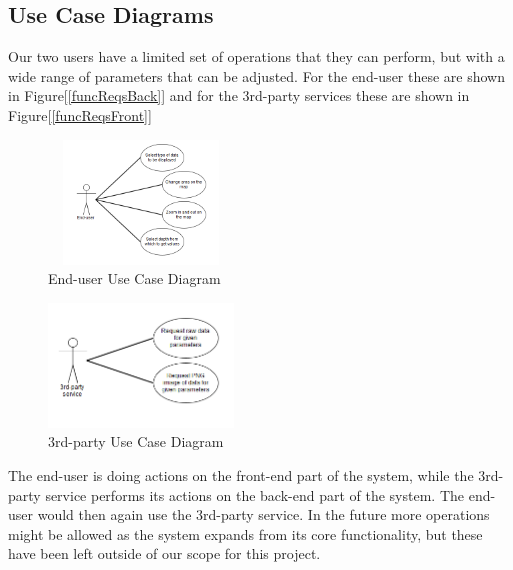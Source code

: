 \documentclass[11pt,a4paper,titlepage,oneside]{report}
\begin{document}
  \subsection{Use Case Diagrams}
  Our two users have a limited set of operations that they can perform, but with a wide range of parameters that can be adjusted. For the end-user these are shown in Figure[\ref{funcReqsBack}] and for the 3rd-party services these are shown in Figure[\ref{funcReqsFront}]
  \begin{figure}[h]
	\begin{center}
	\includegraphics[height=125px,width=186px]{img/useCase_EndUser.png}
	\caption{End-user Use Case Diagram}
	\label{fig:endUserUseDiagram}
	\small
	\end{center}
  \end{figure}

  \begin{figure}[h]
	\begin{center}
	\includegraphics[height=125px,width=186px]{img/useCase_3rdParty.png}
	\caption{3rd-party Use Case Diagram}
	\label{fig:3rdPartyUseDiagram}
	\small
	\end{center}
  \end{figure}

    The end-user is doing actions on the front-end part of the system, while the 3rd-party service performs its actions on the back-end part of the system. The end-user would then again use the 3rd-party service. In the future more operations might be allowed as the system expands from its core functionality, but these have been left outside of our scope for this project.
\end{document}
